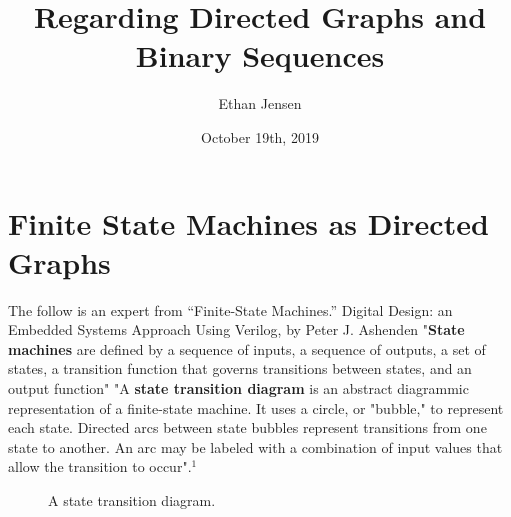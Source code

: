 \documentclass[12pt]{article}
\title{Regarding Directed Graphs and Binary Sequences}
\author{Ethan Jensen }
\date{October 19th, 2019}
\begin{document}
	\maketitle


\section[20pt]{Finite State Machines as Directed Graphs}
The follow is an expert from “Finite-State Machines.” Digital Design: an Embedded Systems Approach Using Verilog, by Peter J. Ashenden
\newline
\newline
"\textbf{State machines} are defined by a sequence of inputs, a sequence of outputs, a set of states, a transition function that governs transitions between states, and an output function"
\newline
\newline
"A \textbf{state transition diagram} is an abstract diagrammic representation of a finite-state machine. It uses a circle, or "bubble," to represent each state. Directed arcs between state bubbles represent transitions from one state to another. An arc may be labeled with a combination of input values that allow the transition to occur"\(.^{1}\)

\begin{figure}[ht] %
	\centering %
	\caption{A state transition diagram.}
	\label{fig:my_label}
\end{figure}
\end{document}
